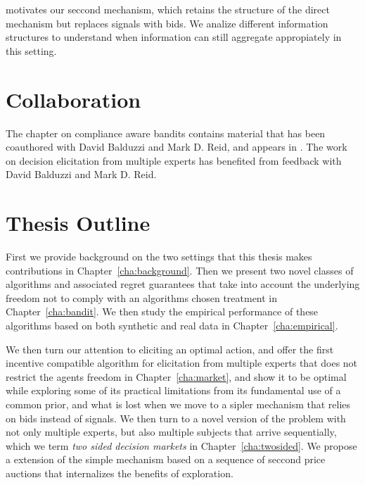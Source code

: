 motivates our seccond mechanism, which retains the structure of the direct mechanism but replaces signals with bids. We analize different information structures to understand when information can still aggregate appropiately in this setting.


\section{Collaboration}

The chapter on compliance aware bandits contains material that has been coauthored with David Balduzzi and Mark D. Reid, and appears in \cite{della2016compliance}. The work on decision elicitation from multiple experts has benefited from feedback with David Balduzzi and Mark D. Reid.


\section{Thesis Outline}
\label{sec:outline}

First we provide background on the two settings that this thesis makes contributions in  Chapter~\ref{cha:background}. Then we present two novel classes of algorithms and associated regret guarantees that take into account the underlying freedom not to comply with an algorithms chosen treatment in Chapter~\ref{cha:bandit}. We then study the empirical performance  of these algorithms based on both synthetic and real data in Chapter~\ref{cha:empirical}. 

We then turn our attention to eliciting an optimal action, and offer the first incentive compatible algorithm for elicitation from multiple experts that does not restrict the agents freedom in Chapter~\ref{cha:market}, and show it to be optimal while exploring some of its practical limitations from its fundamental use of a common prior, and what is lost when we move to a sipler mechanism that relies on bids instead of signals. We then turn to a novel version of the problem with not only multiple experts, but also multiple subjects that arrive sequentially, which we term \emph{two sided decision markets} in Chapter~\ref{cha:twosided}. We propose a extension of the simple mechanism based on a sequence of seccond price auctions that internalizes the benefits of exploration.

